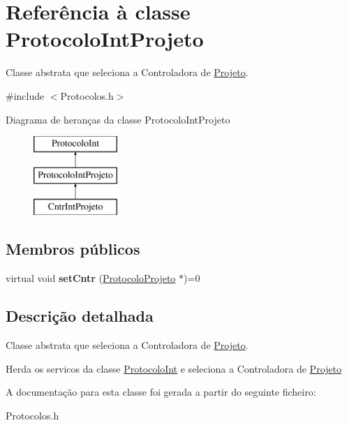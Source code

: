 \hypertarget{class_protocolo_int_projeto}{
\section{\-Referência à classe \-Protocolo\-Int\-Projeto}
\label{class_protocolo_int_projeto}
}


\-Classe abstrata que seleciona a \-Controladora de \hyperlink{class_projeto}{\-Projeto}.  




{\ttfamily \#include $<$\-Protocolos.\-h$>$}

\-Diagrama de heranças da classe \-Protocolo\-Int\-Projeto\begin{figure}[H]
\begin{center}
\leavevmode
\includegraphics[height=3.000000cm]{class_protocolo_int_projeto}
\end{center}
\end{figure}
\subsection*{\-Membros públicos}
\begin{DoxyCompactItemize}
\item 
\hypertarget{class_protocolo_int_projeto_a4d71d138aa99b9ce9deb055fee8f4338}{
virtual void {\bfseries set\-Cntr} (\hyperlink{class_protocolo_projeto}{\-Protocolo\-Projeto} $\ast$)=0}
\label{class_protocolo_int_projeto_a4d71d138aa99b9ce9deb055fee8f4338}

\end{DoxyCompactItemize}


\subsection{\-Descrição detalhada}
\-Classe abstrata que seleciona a \-Controladora de \hyperlink{class_projeto}{\-Projeto}. 

\-Herda os servicos da classe \hyperlink{class_protocolo_int}{\-Protocolo\-Int} e seleciona a \-Controladora de \hyperlink{class_projeto}{\-Projeto} 

\-A documentação para esta classe foi gerada a partir do seguinte ficheiro\-:\begin{DoxyCompactItemize}
\item 
\-Protocolos.\-h\end{DoxyCompactItemize}
